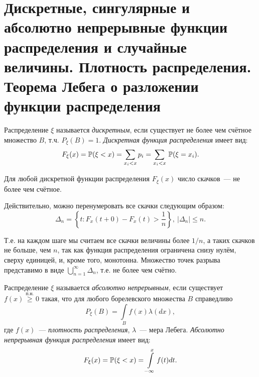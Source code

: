 \section{Дискретные, сингулярные и абсолютно непрерывные функции распределения и случайные величины. Плотность распределения. Теорема Лебега о разложении функции распределения}

\begin{defn}
    Распределение $\xi$ называется \textit{дискретным}, если существует не более чем счётное множество $B$, т.ч. $P_\xi(B) = 1$. 
    \textit{Дискретная функция распределения} имеет вид:
    \begin{equation*}
        F_\xi(x) = \operatorname{\mathbb{P}}(\xi < x) = \sum\limits_{x_i < x}{}p_{i} = \sum\limits_{x_i < x}{}\operatorname{\mathbb{P}}(\xi = x_{i}).
    \end{equation*}
\end{defn}

\begin{rmrk}
    Для любой дискретной функции распределения $F_\xi(x)$ число скачков~--- не более чем счётное.
    
    Действительно, можно перенумеровать все скачки следующим образом:
    \begin{equation*}
        \Delta_{n}=\left\{t \colon F_{x}(t+0)-F_{x}(t)>\frac{1}{n}\right\},~ |\Delta_{n} | \leqslant n.
    \end{equation*}
    
    Т.е. на каждом шаге мы считаем все скачки величины более $1 / n$, а таких скачков не больше, чем $n$, так как функция распределения ограничена снизу нулём, сверху единицей, и, кроме того, монотонна.
    Множество точек разрыва представимо в виде $\bigcup\limits_{n = 1}^{\infty} \Delta_{n}$, т.е. не более чем счётно.
\end{rmrk}

\begin{defn}
    Распределение $\xi$ называется \textit{абсолютно непрерывным}, если существует $f(x) \overset{\text{п.н.}}{\geqslant} 0$ такая, что для любого борелевского множества $B$ справедливо
    \begin{equation*}
        P_\xi(B) = \int\limits_B f(x) \lambda(dx),
    \end{equation*}
    где $f(x)$~--- \textit{плотность распределения}, $\lambda$~--- мера Лебега. 
    \textit{Абсолютно непрерывная функция распределения} имеет вид:
    \begin{equation*}
        F_\xi(x) = \operatorname{\mathbb{P}}(\xi < x) = \int\limits_{-\infty}^x f(t)dt.
    \end{equation*}
\end{defn}

